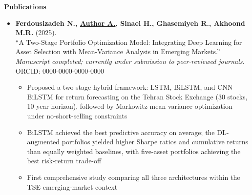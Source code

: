 \documentclass[11pt,a4paper]{article}
\newcommand{\itemspace}{\vspace{0.4em}}
\newcommand{\sectionspace}{\itemspace}
\newcommand{\cvsection}[1]{
    \sectionspace
    \noindent\textcolor{primary}{\Large \textbf{#1}} \textcolor{primary}{\hrulefill}
    \par\vspace{0.4em}
}
\providecommand{\cvorcid}{0000-0000-0000-0000}
\providecommand{\cvauthorcitation}{Author A.}
\begin{document}
\cvsection{Publications}

\begin{itemize}[leftmargin=1em, label={}]
    \item \textbf{Ferdousizadeh N., \underline{\cvauthorcitation}, Sinaei H., Ghasemiyeh R., Akhoond M.R.} (2025). \\
    ``A Two-Stage Portfolio Optimization Model: Integrating Deep Learning for Asset Selection with Mean-Variance Analysis in Emerging Markets.''\\
    \emph{Manuscript completed; currently under submission to peer-reviewed journals.} \quad ORCID: \cvorcid
    \begin{itemize}[leftmargin=1.5em, label=$\bullet$, nosep]
        \item Proposed a two-stage hybrid framework: LSTM, BiLSTM, and CNN--BiLSTM for return forecasting on the Tehran Stock Exchange (30 stocks, 10-year horizon), followed by Markowitz mean-variance optimization under no-short-selling constraints
        \item BiLSTM achieved the best predictive accuracy on average; the DL-augmented portfolios yielded higher Sharpe ratios and cumulative returns than equally weighted baselines, with five-asset portfolios achieving the best risk-return trade-off
        \item First comprehensive study comparing all three architectures within the TSE emerging-market context
    \end{itemize}
\end{itemize}
\end{document}
